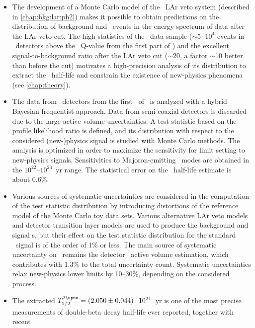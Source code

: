 \chapendgliph{}

\chapsummary
\begin{itemize}
  \item The development of a Monte Carlo model of the \gerda\ LAr veto system (described
    in \cref{chap:bkg:lar:ph2}) makes it possible to obtain predictions on the
    distribution of background and \nnbb\ events in the energy spectrum of data after the
    LAr veto cut. The high statistics of the \nnbb\ data sample ($\sim$$5 \cdot 10^4$
    events in \bege\ detectors above the \Arl\ Q-value from the first part of \phasetwo)
    and the excellent signal-to-background ratio after the LAr veto cut ($\sim$20, a
    factor $\sim$10 better than before the cut) motivates a high-precision analysis of its
    distribution to extract the \nnbb\ half-life and constrain the existence of
    new-physics phenomena (see \cref{chap:theory}).
  \item The data from \bege\ detectors from the first \gexpophasetwobkg\ of \phasetwo\
    is analyzed with a hybrid Bayesian-frequentist approach. Data from semi-coaxial
    detectors is discarded due to the large active volume uncertainties. A test statistic
    based on the profile likelihood ratio is defined, and its distribution with respect to
    the considered (new-)physics signal is studied with Monte Carlo methods. The analysis
    is optimized in order to maximize the sensitivity for limit setting to new-physics
    signals. Sensitivities to Majoron-emitting \onbb\ modes are obtained in the
    $10^{22}$--$10^{23}$~yr range. The statistical error on the \nnbb\ half-life estimate
    is about 0.6\%.
  \item Various sources of systematic uncertainties are considered in the computation of
    the test statistic distribution by introducing distortions of the reference model of
    the Monte Carlo toy data sets. Various alternative LAr veto models and detector
    transition layer models are used to produce the background and signal \pdf{}s, but
    their effect on the test statistic distribution for the standard \nnbb\ signal is of
    the order of 1\% or less. The main source of systematic uncertainty on \thalftwo\
    remains the detector \gesix\ active volume estimation, which contributes with 1.3\% to
    the total uncertainty count. Systematic uncertainties relax new-physics lower limits
    by 10--30\%, depending on the considered process.
  \item The extracted $\thalftwoM = \thalftwovalueshort$~yr is one of the most precise
    measurements of double-beta decay half-life ever reported, together with recent
$$
\end{itemize}
